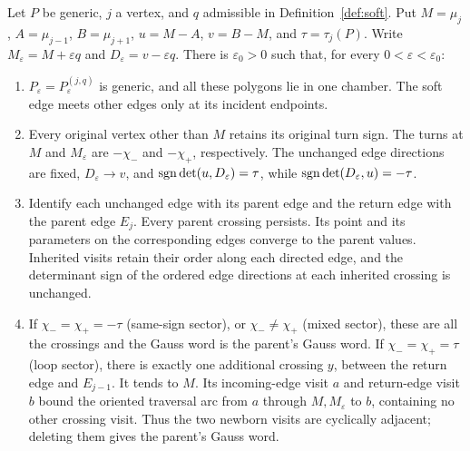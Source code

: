 \begin{lemma}\label{lem:soft-generic}
Let $P$ be generic, $j$ a vertex, and $q$ admissible in
Definition~\ref{def:soft}. Put $M=\mu_j$, $A=\mu_{j-1}$,
$B=\mu_{j+1}$, $u=M-A$, $v=B-M$, and $\tau=\tau_j(P)$.
Write $M_\varepsilon=M+\varepsilon q$ and
$D_\varepsilon=v-\varepsilon q$. There is $\varepsilon_0>0$
such that, for every $0<\varepsilon<\varepsilon_0$:
\begin{enumerate}
\item[(i)] $P_\varepsilon=P^{(j,q)}_\varepsilon$ is generic,
and all these polygons lie in one chamber. The soft edge meets
other edges only at its incident endpoints.
\item[(ii)] Every original vertex other than $M$ retains its
original turn sign. The turns at $M$ and $M_\varepsilon$ are
$-\chi_-$ and $-\chi_+$, respectively. The unchanged edge
 directions are fixed, $D_\varepsilon\to v$, and
$\operatorname{sgn}\det(u,D_\varepsilon)=\tau$, while
$\operatorname{sgn}\det(D_\varepsilon,u)=-\tau$.
\item[(iii)] Identify each unchanged edge with its parent edge
and the return edge with the parent edge $E_j$. Every parent
crossing persists. Its point and its parameters on the corresponding
edges converge to the parent values. Inherited visits retain their
order along each directed edge, and the determinant sign of the
ordered edge directions at each inherited crossing is unchanged.
\item[(iv)] If $\chi_-=\chi_+=-\tau$ (same-sign sector), or
$\chi_-\ne\chi_+$ (mixed sector), these are all the crossings
and the Gauss word is the parent's Gauss word. If
$\chi_-=\chi_+=\tau$ (loop sector), there is exactly one
additional crossing $y$, between the return edge and $E_{j-1}$.
It tends to $M$. Its incoming-edge visit $a$ and return-edge
visit $b$ bound the oriented traversal arc from $a$ through
$M,M_\varepsilon$ to $b$, containing no other crossing visit.
Thus the two newborn visits are cyclically adjacent; deleting
 them gives the parent's Gauss word.
\end{enumerate}
\end{lemma}
